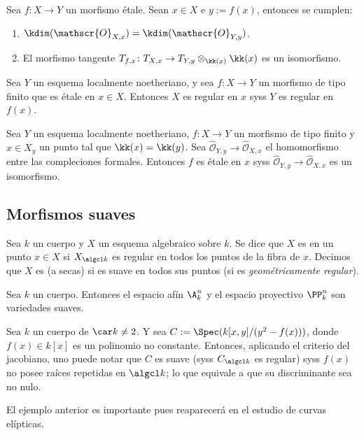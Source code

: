 \begin{prop}
	Sea $f \colon X \to Y$ un morfismo étale.
	Sean $x \in X$ e $y := f(x)$, entonces se cumplen:
	\begin{enumerate}
		\item $\kdim(\mathscr{O}_{X, x}) = \kdim(\mathscr{O}_{Y, y})$.
		\item El morfismo tangente $T_{f, x} \colon T_{X, x} \to T_{Y, y} \otimes_{\kk(x)} \kk(x)$ es un isomorfismo.
	\end{enumerate}
\end{prop}
\begin{cor}
	Sea $Y$ un esquema localmente noetheriano, y sea $f \colon X \to Y$ un morfismo de tipo finito que es étale en $x \in X$.
	Entonces $X$ es regular en $x$ syss $Y$ es regular en $f(x)$.
\end{cor}

\begin{prop}
	Sea $Y$ un esquema localmente noetheriano, $f \colon X \to Y$ un morfismo de tipo finito y $x \in X_y$ un punto tal que $\kk(x) = \kk(y)$.
	Sea $\widehat{\mathscr{O}}_{Y, y} \to \widehat{\mathscr{O}}_{X, x}$ el homomorfismo entre las compleciones formales.
	Entonces $f$ es étale en $x$ syss $\widehat{\mathscr{O}}_{Y, y} \to \widehat{\mathscr{O}}_{X, x}$ es un isomorfismo.
\end{prop}

\subsection{Morfismos suaves}
\begin{mydef}
	Sea $k$ un cuerpo y $X$ un esquema algebraico sobre $k$.
	Se dice que $X$ es  en un punto $x \in X$ si $X_{\algcl k}$ es regular
	en todos los puntos de la fibra de $x$.
	Decimos que $X$ es  (a secas) si es suave en todos sus puntos (si es \textit{geométricamente regular}).
\end{mydef}
\begin{ex}
	Sea $k$ un cuerpo.
	Entonces el espacio afín $\A^n_k$ y el espacio proyectivo $\PP^n_k$ son variedades suaves.
\end{ex}

\begin{exn}
	Sea $k$ un cuerpo de $\car k \ne 2$.
	Y sea $C := \Spec( k[x, y] / (y^2 - f(x)) )$, donde $f(x) \in k[x]$ es un polinomio no constante.
	Entonces, aplicando el criterio del jacobiano, uno puede notar que $C$ es suave (syss $C_{\algcl k}$ es regular) syss $f(x)$ no posee raíces
	repetidas en $\algcl k$; lo que equivale a que su discriminante sea no nulo.
\end{exn}
El ejemplo anterior es importante pues reaparecerá en el estudio de curvas elípticas.

